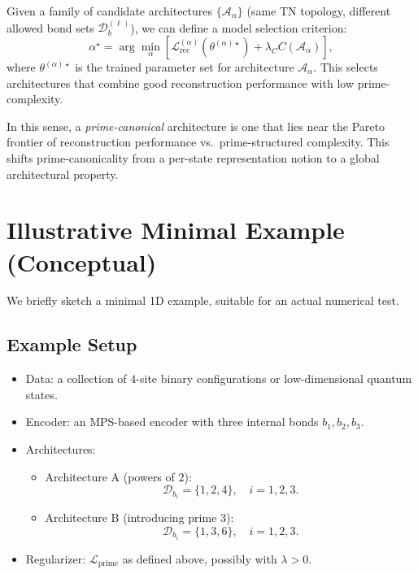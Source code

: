 \documentclass[11pt]{article}
\begin{document}
Given a family of candidate architectures $\{\mathcal{A}_\alpha\}$ (same TN topology, different allowed bond sets $\mathcal{D}_b^{(\ell)}$), we can define a model selection criterion:
\[
\alpha^\star = \arg\min_{\alpha}
\left[
\mathcal{L}_{\mathrm{rec}}^{(\alpha)}(\theta^{(\alpha)\star})
+ \lambda_C C(\mathcal{A}_\alpha)
\right],
\]
where $\theta^{(\alpha)\star}$ is the trained parameter set for architecture $\mathcal{A}_\alpha$. This selects architectures that combine good reconstruction performance with low prime-complexity.

In this sense, a \emph{prime-canonical} architecture is one that lies near the Pareto frontier of reconstruction performance vs.\ prime-structured complexity. This shifts prime-canonicality from a per-state representation notion to a global architectural property.

\section{Illustrative Minimal Example (Conceptual)}

We briefly sketch a minimal 1D example, suitable for an actual numerical test.

\subsection{Example Setup}

\begin{itemize}[leftmargin=1.5em]
    \item Data: a collection of $4$-site binary configurations or low-dimensional quantum states.

    \item Encoder: an MPS-based encoder with three internal bonds $b_1, b_2, b_3$.

    \item Architectures:
    \begin{itemize}
        \item Architecture A (powers of $2$):
        \[
        \mathcal{D}_{b_i} = \{1,2,4\},\quad i=1,2,3.
        \]
        \item Architecture B (introducing prime $3$):
        \[
        \mathcal{D}_{b_i} = \{1,3,6\},\quad i=1,2,3.
        \]
    \end{itemize}
    \item Regularizer: $\mathcal{L}_{\mathrm{prime}}$ as defined above, possibly with \(\lambda > 0\).
\end{itemize}
\end{document}
